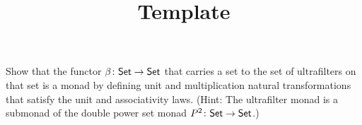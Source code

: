 \documentclass[../../solutions]{subfiles}
\title{Template}
\author{}
\begin{document}
\maketitle

%

\begin{exercise}
  Show that the functor ${\beta}\colon{\ensuremath{\mathsf{Set}}}\to{\ensuremath{\mathsf{Set}}}$ that carries a set
  to the set of ultrafilters on that set is a monad by defining unit
  and multiplication natural transformations that satisfy the unit and
  associativity laws. (Hint: The ultrafilter monad is a submonad of
  the double power set monad ${P^2}\colon{\ensuremath{\mathsf{Set}}}\to{\ensuremath{\mathsf{Set}}}$.)
\end{exercise}
\end{document}
